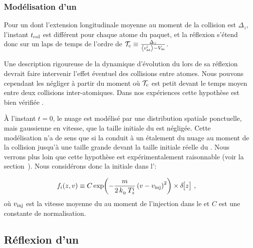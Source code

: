 \subsubsection{Modélisation d'un \pat}

Pour un \pat dont l'extension longitudinale moyenne au moment de la collision est $\Delta_z$, l'instant $t_{\mathrm {col}}$ est différent pour chaque atome du paquet, et la réflexion s'étend donc sur un laps de temps de l'ordre de $\mathcal{T}_{\rm c} \equiv \tfrac{\Delta_z}{\left\langle {v_{\mathrm {at}}^{\rm i}} \right\rangle-V_{\rm {m}}}$.
%
%
  
Une description rigoureuse de la dynamique d'évolution  du \pat lors de sa réflexion devrait faire intervenir l'effet éventuel des collisions entre atomes. Nous pouvons cependant les négliger à partir du moment où $\mathcal{T}_{\rm c}$ est petit devant le temps moyen entre deux collisions inter-atomiques. Dans nos expériences cette hypothèse est bien vérifiée%
.

\`A l'instant $t=0$, le nuage est modélisé par une distribution spatiale ponctuelle, mais gaussienne en vitesse, \cad que la taille initiale du \pat est négligée. Cette modélisation n'a de sens que si la \dispvitlong conduit à un étalement du nuage au moment de la collision jusqu'à une taille grande devant la taille initiale réelle du \pat. Nous verrons plus loin que cette hypothèse est expérimentalement raisonnable (voir la section~). Nous considérons donc la \fdd initiale dans l'\edpup:

\begin{equation}
	f_i(z,v) \equiv C \Expo{-\frac{m}{2\,\kb\,\Tlongini} 
	\left( v - \vinj \right)^2} \times \Dirac{z}
	\virguleformule
	\label{eq:fiPaquet}
\end{equation}
où $v_{{\rm {inj}}}$ est la vitesse moyenne du \pat au moment de l'injection dans le \gm et $C$ est une constante de normalisation.
%
%


\subsection{Réflexion d'un \pat}
